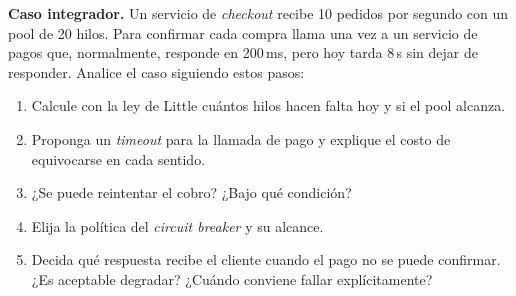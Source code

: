 \documentclass[variant=guia,cover=institutional,mode=screen]{ua-engineering-v6-article}
\begin{document}
\begin{uaexercise}
\textbf{Caso integrador.} Un servicio de \emph{checkout} recibe 10 pedidos por segundo con un pool de 20 hilos. Para confirmar cada compra llama una vez a un servicio de pagos que, normalmente, responde en 200\,ms, pero hoy tarda 8\,s sin dejar de responder. Analice el caso siguiendo estos pasos:
\begin{enumerate}
\item Calcule con la ley de Little cuántos hilos hacen falta hoy y si el pool alcanza.
\item Proponga un \emph{timeout} para la llamada de pago y explique el costo de equivocarse en cada sentido.
\item ¿Se puede reintentar el cobro? ¿Bajo qué condición?
\item Elija la política del \emph{circuit breaker} y su alcance.
\item Decida qué respuesta recibe el cliente cuando el pago no se puede confirmar. ¿Es aceptable degradar? ¿Cuándo conviene fallar explícitamente?
\end{enumerate}
\end{uaexercise}
\end{document}
